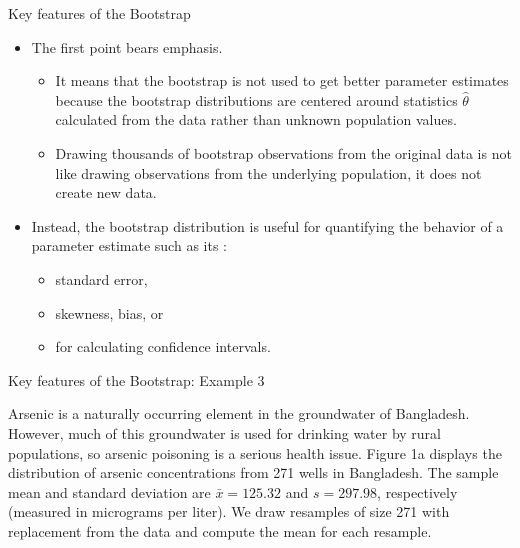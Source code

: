 \documentclass[
  ignorenonframetext,
]{beamer}
\providecommand{\tightlist}{%
  \setlength{\itemsep}{0pt}\setlength{\parskip}{0pt}}
\begin{document}
\begin{frame}{Key features of the Bootstrap}
\label{key-features-of-the-bootstrap-2}
\begin{itemize}
\item
  The first point bears emphasis.

  \begin{itemize}
  \tightlist
  \item
    It means that the bootstrap is not used to get better parameter
    estimates because the bootstrap distributions are centered around
    statistics \(\hat{\theta}\) calculated from the data rather than
    unknown population values.
  \item
    Drawing thousands of bootstrap observations from the original data
    is not like drawing observations from the underlying population, it
    does not create new data.
  \end{itemize}
\item
  Instead, the bootstrap distribution is useful for quantifying the
  behavior of a parameter estimate such as its :

  \begin{itemize}
  \tightlist
  \item
    standard error,
  \item
    skewness, bias, or
  \item
    for calculating confidence intervals.
  \end{itemize}
\end{itemize}
\end{frame}

\begin{frame}{Key features of the Bootstrap: Example 3}
\label{key-features-of-the-bootstrap-example-3}
\begin{tcolorbox}
Arsenic is a naturally occurring element in the groundwater of Bangladesh. However, much of this groundwater is used for drinking water by rural populations, so arsenic poisoning is a serious health issue. Figure 1a displays the distribution of arsenic concentrations from 271 wells in Bangladesh. The sample mean and standard deviation are $\bar{x}=125.32$ and $s =297.98$, respectively (measured in micrograms per liter). We draw resamples of size 271 with replacement from the data and compute the mean for each resample.
\end{tcolorbox}
\end{frame}
\end{document}
